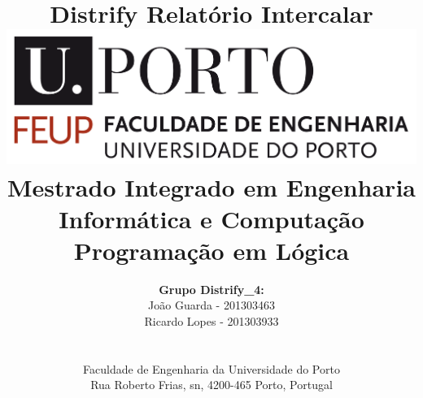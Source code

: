 \documentclass[a4paper]{article}
\begin{document}
\setlength{\textwidth}{16cm}
\setlength{\textheight}{22cm}

\title{\Huge\textbf{Distrify}\linebreak\linebreak\linebreak
\Large\textbf{Relatório Intercalar}\linebreak\linebreak
\linebreak\linebreak
\includegraphics[scale=0.1]{feup-logo.png}\linebreak\linebreak
\linebreak\linebreak
\Large{Mestrado Integrado em Engenharia Informática e Computação} \linebreak\linebreak
\Large{Programação em Lógica}\linebreak
}

\author{\textbf{Grupo Distrify\_4:}\\
João Guarda - 201303463 \\
Ricardo Lopes - 201303933 \\
\linebreak\linebreak \\
 \\ Faculdade de Engenharia da Universidade do Porto \\ Rua Roberto Frias, s\/n, 4200-465 Porto, Portugal \linebreak\linebreak\linebreak
\linebreak\linebreak\vspace{1cm}}

\maketitle
\thispagestyle{empty}
\end{document}
